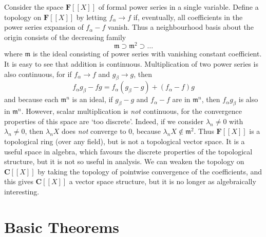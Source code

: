 \begin{example}
    Consider the space $\mathbf{F}[[X]]$ of formal power series in a single variable. Define a topology on $\mathbf{F}[[X]]$ by letting $f_\alpha \to f$ if, eventually, all coefficients in the power series expansion of $f_\alpha - f$ vanish. Thus a neighbourhood basis about the origin consists of the decreasing family
    \[ \mathfrak{m} \supset \mathfrak{m}^2 \supset \dots \]
    where $\mathfrak{m}$ is the ideal consisting of power series with vanishing constant coefficient. It is easy to see that addition is continuous. Multiplication of two power series is also continuous, for if $f_\alpha \to f$ and $g_\beta \to g$, then
    \[ f_\alpha g_\beta - fg = f_\alpha (g_\beta - g) + (f_\alpha - f) g \]
    and because each $\mathfrak{m}^n$ is an ideal, if $g_\beta - g$ and $f_\alpha - f$ are in $\mathfrak{m}^n$, then $f_\alpha g_\beta$ is also in $\mathfrak{m}^n$. However, scalar multiplication is {\it not} continuous, for the convergence properties of this space are `too discrete'. Indeed, if we consider $\lambda_n \neq 0$ with $\lambda_n \neq 0$, then $\lambda_n X$ does {\it not} converge to 0, because $\lambda_n X \not \in \mathfrak{m}^2$. Thus $\mathbf{F}[[X]]$ is a topological ring (over any field), but is not a topological vector space. It is a useful space in algebra, which favours the discrete properties of the topological structure, but it is not so useful in analysis. We can weaken the topology on $\mathbf{C}[[X]]$ by taking the topology of pointwise convergence of the coefficients, and this gives $\mathbf{C}[[X]]$ a vector space structure, but it is no longer as algebraically interesting.
\end{example}

\section{Basic Theorems}

